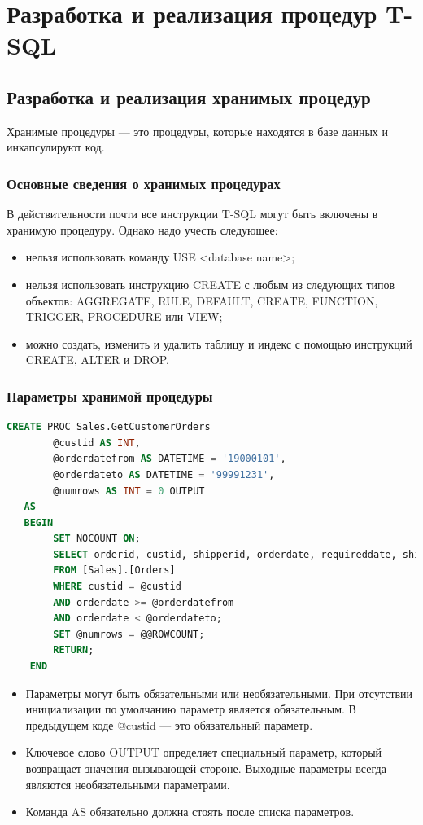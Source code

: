 \chapter{Разработка и реализация процедур T-SQL}
\section{Разработка и реализация хранимых процедур}

Хранимые процедуры — это процедуры, которые находятся в базе данных и
инкапсулируют код. 


\subsection{Основные сведения о хранимых процедурах }


В действительности почти все инструкции
T-SQL могут быть включены в хранимую процедуру. Однако надо учесть следующее: 

\begin{itemize}
	\item нельзя использовать команду USE <database name>; 
	\item нельзя использовать инструкцию CREATE с любым из следующих типов объектов: AGGREGATE, RULE, DEFAULT, CREATE, FUNCTION, TRIGGER, PROCEDURE или VIEW; 
	\item можно создать, изменить и удалить таблицу и индекс с помощью инструкций
	CREATE, ALTER и DROP. 
\end{itemize}

\subsection{Параметры хранимой процедуры}


\begin{lstlisting}[label=lst:funcReturn, language=sql]
	CREATE PROC Sales.GetCustomerOrders
		@custid AS INT,
		@orderdatefrom AS DATETIME = '19000101',
		@orderdateto AS DATETIME = '99991231',
		@numrows AS INT = 0 OUTPUT
   AS
   BEGIN
		SET NOCOUNT ON;
		SELECT orderid, custid, shipperid, orderdate, requireddate, shippeddate
		FROM [Sales].[Orders]
		WHERE custid = @custid
		AND orderdate >= @orderdatefrom
		AND orderdate < @orderdateto;
		SET @numrows = @@ROWCOUNT;
   		RETURN;
	END 
\end{lstlisting}

\begin{itemize}
	\item Параметры могут быть обязательными или необязательными. При отсутствии инициализации по умолчанию параметр является обязательным. В предыдущем коде @custid — это обязательный параметр. 
	\item Ключевое слово OUTPUT определяет специальный параметр, который возвращает
	значения вызывающей стороне. Выходные параметры всегда являются необязательными параметрами. 
	\item Команда AS обязательно должна стоять после списка параметров. 
\end{itemize}

